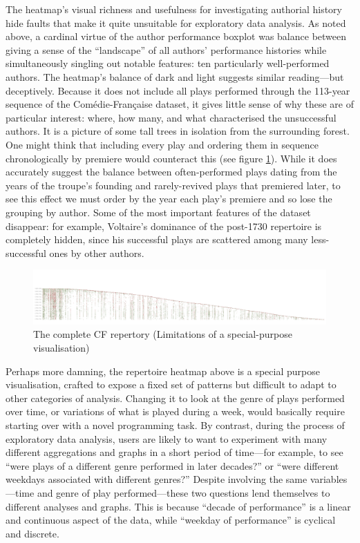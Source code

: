 \documentclass[	DIV=calc,%
							paper=a4,%
							fontsize=11pt,%
							twocolumn]{scrartcl}	 					%
\begin{document}
The heatmap’s visual richness and usefulness for investigating authorial history hide faults that make it quite unsuitable for exploratory data analysis.  As noted above, a cardinal virtue of the author performance boxplot was balance between giving a sense of the ``landscape'' of all authors’ performance histories while simultaneously singling out notable features: ten particularly well-performed authors.  The heatmap’s balance of dark and light suggests similar reading—but deceptively.  Because it does not include all plays performed through the 113-year sequence of the Comédie-Française dataset, it gives little sense of why these are of particular interest: where, how many, and what characterised the unsuccessful authors.  It is a picture of some tall trees in isolation from the surrounding forest.  One might think that including every play and ordering them in sequence chronologically by premiere would counteract this (see figure \ref{fig:heatmap_all}).  While it does accurately suggest the balance between often-performed plays dating from the years of the troupe’s founding and rarely-revived plays that premiered later, to see this effect we must order by the year each play’s premiere and so lose the grouping by author.  Some of the most important features of the dataset disappear: for example, Voltaire’s dominance of the post-1730 repertoire is completely hidden, since his successful plays are scattered among many less-successful ones by other authors.

\begin{figure}
  \centering
	\includegraphics[width=9.5in,angle=270]{viz/repertoire_by_season_all.pdf}
	\caption{The complete CF repertory
	         \newline
	         (Limitations of a special-purpose visualisation)}
  \label{fig:heatmap_all}
\end{figure}

Perhaps more damning, the repertoire heatmap above is a special purpose visualisation, crafted to expose a fixed set of patterns but difficult to adapt to other categories of analysis.  Changing it to look at the genre of plays performed over time, or variations of what is played during a week, would basically require starting over with a novel programming task.  By contrast, during the process of exploratory data analysis, users are likely to want to experiment with many different aggregations and graphs in a short period of time—for example, to see ``were plays of a different genre performed in later decades?'' or ``were different weekdays associated with different genres?''  Despite involving the same variables—time and genre of play performed—these two questions lend themselves to different analyses and graphs.  This is because ``decade of performance'' is a linear and continuous aspect of the data, while ``weekday of performance'' is cyclical and discrete.
\end{document}
